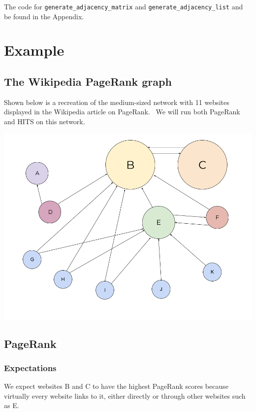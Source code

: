 \documentclass[12pt, titlepage, twoside]{amsart}
\begin{document}
The code for \texttt{generate_adjacency_matrix} and \texttt{generate_adjacency_list} and be
found in the Appendix.

\section{Example}

\subsection{The Wikipedia PageRank graph}

Shown below is a recreation of the medium-sized network with 11 websites displayed in
the Wikipedia article on PageRank.~\cite{pagerank}\cite{snap}
We will run both PageRank and HITS on this network.

\begin{center}
  \includegraphics[scale = 0.4]{wikipedia.png}
\end{center}


\subsection{PageRank}

\subsubsection{Expectations}

We expect websites B and C to have the highest PageRank scores
because virtually every website links to it, either directly or through other websites such as E.
\end{document}
